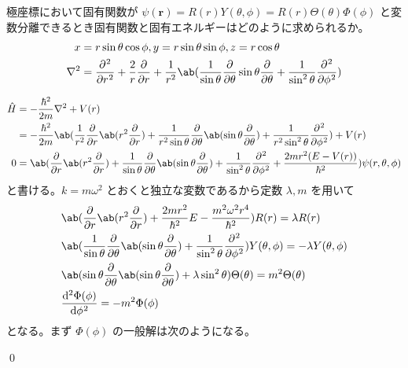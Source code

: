 \documentclass[uplatex,dvipdfmx,a4paper,11pt]{jlreq}
\makeatletter
\newcommand{\rr}{\bm{r}}
\newcommand{\laplacian}{\nabla^2}
\theoremstyle{definition}
\renewenvironment{proof}[1][\proofname]{\par
  \normalfont
  \topsep6\p@\@plus6\p@ \trivlist
  \item[\hskip\labelsep{\bfseries #1}\@addpunct{\bfseries}]\ignorespaces\quad\par
}{%
  \qed\endtrivlist\@endpefalse
}
\renewcommand\proofname{証明}
\makeatother
\begin{document}
\begin{problem}
極座標において固有関数が $\psi(\rr) = R(r)Y(\theta, \phi) = R(r)\Theta(\theta)\Phi(\phi)$ と変数分離できるとき固有関数と固有エネルギーはどのように求められるか。
\begin{align}
  x          & = r\sin\theta\cos\phi, y = r\sin\theta\sin\phi, z = r\cos\theta                                                                                                        \\
  \laplacian & = \diffp[2]{}{r} + \frac{2}{r}\diffp{}{r} + \frac{1}{r^2}\ab(\frac{1}{\sin\theta}\diffp{}{\theta}\sin\theta\diffp{}{\theta} + \frac{1}{\sin^2\theta}\diffp[2]{}{\phi})
\end{align}
\end{problem}
\begin{proof}
  \begin{align}
    \hat{H} & = -\frac{\hbar^2}{2m}\laplacian + V(r)                                                                                                                                                                        \\
            & = -\frac{\hbar^2}{2m}\ab(\frac{1}{r^2}\diffp{}{r}\ab(r^2\diffp{}{r}) + \frac{1}{r^2\sin\theta}\diffp{}{\theta}\ab(\sin\theta\diffp{}{\theta}) + \frac{1}{r^2\sin^2\theta}\diffp[2]{}{\phi}) + V(r)            \\
    0       & = \ab(\diffp{}{r}\ab(r^2\diffp{}{r}) + \frac{1}{\sin\theta}\diffp{}{\theta}\ab(\sin\theta\diffp{}{\theta}) + \frac{1}{\sin^2\theta}\diffp[2]{}{\phi} + \frac{2m r^2(E - V(r))}{\hbar^2})\psi(r, \theta, \phi)
  \end{align}
  と書ける。$k = m\omega^2$ とおくと独立な変数であるから定数 $\lambda, m$ を用いて
  \begin{align}
     & \ab(\diffp{}{r}\ab(r^2\diffp{}{r}) + \frac{2m r^2}{\hbar^2}E - \frac{m^2\omega^2r^4}{\hbar^2})R(r) = \lambda R(r)                                             \\
     & \ab(\frac{1}{\sin\theta}\diffp{}{\theta}\ab(\sin\theta\diffp{}{\theta}) + \frac{1}{\sin^2\theta}\diffp[2]{}{\phi}) Y(\theta, \phi) = -\lambda Y(\theta, \phi) \\
     & \ab(\sin\theta\diffp{}{\theta}\ab(\sin\theta\diffp{}{\theta}) + \lambda \sin^2\theta)\Theta(\theta) = m^2\Theta(\theta)                                       \\
     & \diff[2]{\Phi(\phi)}{\phi} = -m^2\Phi(\phi)
  \end{align}
  となる。まず $\Phi(\phi)$ の一般解は次のようになる。

\end{proof}
\end{document}
